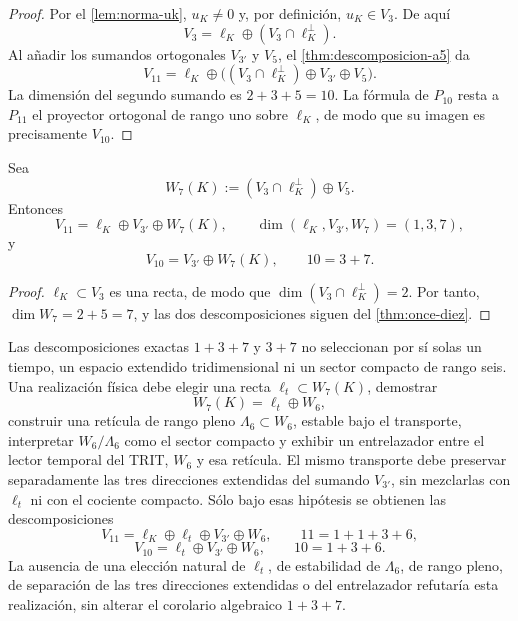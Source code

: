 \begin{proof}
Por el \cref{lem:norma-uk}, \(u_K\neq0\) y, por definición, \(u_K\in V_3\).
De aquí
\[
V_3=\ell_K\oplus(V_3\cap\ell_K^\perp).
\]
Al añadir los sumandos ortogonales \(V_{3'}\) y \(V_5\), el
\cref{thm:descomposicion-a5} da
\[
V_{11}=\ell_K\oplus
\bigl((V_3\cap\ell_K^\perp)\oplus V_{3'}\oplus V_5\bigr).
\]
La dimensión del segundo sumando es \(2+3+5=10\). La fórmula de \(P_{10}\)
resta a \(P_{11}\) el proyector ortogonal de rango uno sobre \(\ell_K\), de
modo que su imagen es precisamente \(V_{10}\).
\end{proof}

\begin{corollary}
\label{cor:descomposicion-1-3-7}
Sea
\[
W_7(K):=(V_3\cap\ell_K^\perp)\oplus V_5.
\]
Entonces
\[
\boxed{
V_{11}=\ell_K\oplus V_{3'}\oplus W_7(K),
\qquad
\dim(\ell_K,V_{3'},W_7)=(1,3,7),}
\]
y
\[
\boxed{
V_{10}=V_{3'}\oplus W_7(K),
\qquad 10=3+7.}
\]
\end{corollary}

\begin{proof}
\(\ell_K\subset V_3\) es una recta, de modo que
\(\dim(V_3\cap\ell_K^\perp)=2\). Por tanto,
\(\dim W_7=2+5=7\), y las dos descomposiciones siguen del
\cref{thm:once-diez}.
\end{proof}

\begin{remark}
\label{rem:interfaz-1-3-6}
Las descomposiciones exactas \(1+3+7\) y \(3+7\) no seleccionan por sí solas
un tiempo, un espacio extendido tridimensional ni un sector compacto de rango
seis. Una realización física debe elegir una recta
\(\ell_t\subset W_7(K)\), demostrar
\[
W_7(K)=\ell_t\oplus W_6,
\]
construir una retícula de rango pleno
\(\Lambda_6\subset W_6\), estable bajo el transporte, interpretar
\(W_6/\Lambda_6\) como el sector compacto y exhibir un entrelazador entre el
lector temporal del TRIT, \(W_6\) y esa retícula. El mismo transporte debe
preservar separadamente las tres direcciones extendidas del sumando
\(V_{3'}\), sin mezclarlas con \(\ell_t\) ni con el cociente compacto. Sólo
bajo esas hipótesis se obtienen las descomposiciones
\[
\boxed{
V_{11}=\ell_K\oplus\ell_t\oplus V_{3'}\oplus W_6,
\qquad 11=1+1+3+6,}
\]
\[
\boxed{
V_{10}=\ell_t\oplus V_{3'}\oplus W_6,
\qquad 10=1+3+6.}
\]
La ausencia de una elección natural de \(\ell_t\), de estabilidad de
\(\Lambda_6\), de rango pleno, de separación de las tres direcciones
extendidas o del entrelazador refutaría esta realización, sin alterar el
corolario algebraico \(1+3+7\).
\end{remark}

